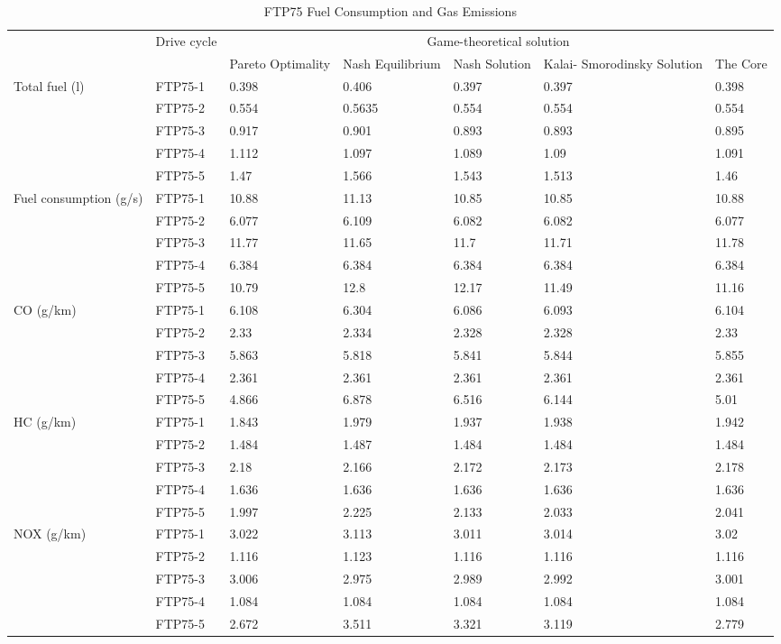 \begin{table}[h]
\centering
\begin{tabular}{ |p{1.5cm}|p{1.5cm}|p{1.3cm}|p{1.3cm}|p{1.3cm}|p{1.3cm}|p{1.3cm}|} 
 \hline
  \cline{3-7}
   & Drive cycle & \multicolumn{5}{|c|}{Game-theoretical solution} \\
   \cline{3-7}
   & & Pareto Optimality & Nash Equilibrium & Nash Solution & Kalai- Smorodinsky Solution & The Core \\
 \hline\hline
 \multirow{5}{*}{\parbox{1.5cm}{Total fuel (l)}} 
 & FTP75-1 & 0.398 & 0.406 & 0.397 & 0.397 & 0.398 \\ 
 & FTP75-2 & 0.554 & 0.5635 & 0.554 & 0.554 & 0.554 \\  
 & FTP75-3 & 0.917 & 0.901 & 0.893 & 0.893 & 0.895 \\ 
 & FTP75-4 & 1.112 & 1.097 & 1.089 & 1.09 & 1.091 \\ 
 & FTP75-5 & 1.47 & 1.566 & 1.543 & 1.513 & 1.46 \\ 
 \hline 
 \multirow{5}{*}{\parbox{1.5cm}{Fuel consumption (g/s)}} 
 & FTP75-1 & 10.88 & 11.13 & 10.85 & 10.85 & 10.88 \\ 
 & FTP75-2 & 6.077 & 6.109 & 6.082 & 6.082 & 6.077 \\ 
 & FTP75-3 & 11.77 & 11.65 & 11.7 & 11.71 & 11.78 \\ 
 & FTP75-4 & 6.384 & 6.384 & 6.384 & 6.384 & 6.384 \\ 
 & FTP75-5 & 10.79 & 12.8 & 12.17 & 11.49 & 11.16 \\ 
 \hline
 \multirow{5}{*}{\parbox{1.5cm}{CO (g/km)}} 
 & FTP75-1 & 6.108 & 6.304 & 6.086 & 6.093 & 6.104 \\ 
 & FTP75-2 & 2.33 & 2.334 & 2.328 & 2.328 & 2.33 \\ 
 & FTP75-3 & 5.863 & 5.818 & 5.841 & 5.844 & 5.855 \\ 
 & FTP75-4 & 2.361 & 2.361 & 2.361 & 2.361 & 2.361 \\ 
 & FTP75-5 & 4.866 & 6.878 & 6.516 & 6.144 & 5.01 \\  
 \hline 
 \multirow{5}{*}{\parbox{1.5cm}{HC (g/km)}} 
 & FTP75-1 & 1.843 & 1.979 & 1.937 & 1.938 & 1.942 \\ 
 & FTP75-2 & 1.484 & 1.487 & 1.484 & 1.484 & 1.484 \\  
 & FTP75-3 & 2.18 & 2.166 & 2.172 & 2.173 & 2.178 \\ 
 & FTP75-4 & 1.636 & 1.636 & 1.636 & 1.636 & 1.636 \\ 
 & FTP75-5 & 1.997 & 2.225 & 2.133 & 2.033 & 2.041 \\  
 \hline
 \multirow{5}{*}{\parbox{1.5cm}{NOX (g/km)}} 
 & FTP75-1 & 3.022 & 3.113 & 3.011 & 3.014 & 3.02 \\
 & FTP75-2 & 1.116 & 1.123 & 1.116 & 1.116 & 1.116 \\ 
 & FTP75-3 & 3.006 & 2.975 & 2.989 & 2.992 & 3.001 \\ 
 & FTP75-4 & 1.084 & 1.084 & 1.084 & 1.084 & 1.084 \\ 
 & FTP75-5 & 2.672 & 3.511 & 3.321 & 3.119 & 2.779 \\ 
 \hline  
\end{tabular}
\caption{FTP75 Fuel Consumption and Gas Emissions}
\label{tab:fuelEmis}
\end{table}

